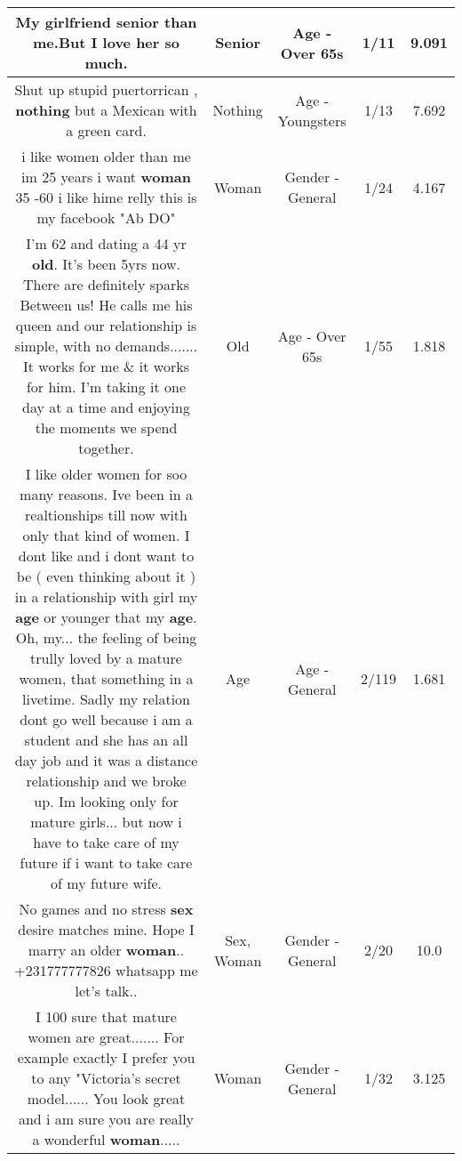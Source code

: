 \documentclass[11pt]{article}
\newlength\mylength
\begin{document}
\begin{center}
\begin{longtable}{|C{.65\mylength}|C{.30\mylength}|C{.12\mylength}|C{.12\mylength}|C{.12\mylength}|}
  \small My girlfriend \textbf{senior} than me.But I love her so much.\normalsize   & Senior & Age - Over 65s & 1/11 & 9.091 \\  \hline
  \small Shut up stupid puertorrican , \textbf{nothing} but a Mexican with a green card.\normalsize   & Nothing & Age - Youngsters & 1/13 & 7.692 \\  \hline
  \small i like women older than me im 25 years i want \textbf{woman} 35 -60 i like hime relly this is my facebook "Ab DO"\normalsize   & Woman & Gender - General & 1/24 & 4.167 \\  \hline
  \small I'm 62 and dating a 44 yr \textbf{old}. It's been 5yrs now. There are definitely sparks Between us! He calls me his queen and our relationship is simple, with no demands....... It works for me \& it works for him. I'm  taking it one day at a time and enjoying the moments we spend together.\normalsize   & Old & Age - Over 65s & 1/55 & 1.818 \\  \hline
  \small I like older women for soo many reasons. Ive been in a realtionships till now with only that kind of women. I dont like and i dont want to be ( even thinking about it ) in a relationship with girl my \textbf{age} or younger that my \textbf{age}. Oh, my... the feeling of being trully loved by a mature women, that something in a livetime. Sadly my relation dont go well because i am a student and she has an all day job and it was a distance relationship and we broke up. Im looking only for mature girls... but now i have to take care of my future if i want to take care of my future wife.\normalsize   & Age & Age - General & 2/119 & 1.681 \\  \hline
  \small No games and no stress \textbf{sex} desire matches mine. Hope I marry an older \textbf{woman}.. +231777777826 whatsapp me let's talk..\normalsize   & Sex, Woman & Gender - General & 2/20 & 10.0 \\  \hline
  \small I 100 sure that mature women are great....... For example exactly I prefer you to any "Victoria's secret model...... You look great and i am sure you are really a wonderful \textbf{woman}.....\normalsize   & Woman & Gender - General & 1/32 & 3.125 \\  \hline

\end{longtable}
\end{center}
\end{document}
